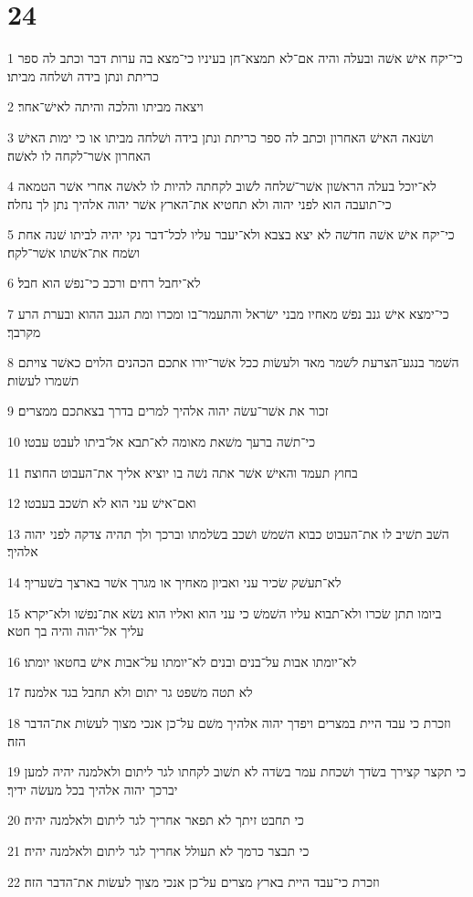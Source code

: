 \chapter{24}

\par 1 כי־יקח אישׁ אשׁה ובעלה והיה אם־לא תמצא־חן בעיניו כי־מצא בה ערות דבר וכתב לה ספר כריתת ונתן בידה ושׁלחה מביתו׃
\par 2 ויצאה מביתו והלכה והיתה לאישׁ־אחר׃
\par 3 ושׂנאה האישׁ האחרון וכתב לה ספר כריתת ונתן בידה ושׁלחה מביתו או כי ימות האישׁ האחרון אשׁר־לקחה לו לאשׁה׃
\par 4 לא־יוכל בעלה הראשׁון אשׁר־שׁלחה לשׁוב לקחתה להיות לו לאשׁה אחרי אשׁר הטמאה כי־תועבה הוא לפני יהוה ולא תחטיא את־הארץ אשׁר יהוה אלהיך נתן לך נחלה׃
\par 5 כי־יקח אישׁ אשׁה חדשׁה לא יצא בצבא ולא־יעבר עליו לכל־דבר נקי יהיה לביתו שׁנה אחת ושׂמח את־אשׁתו אשׁר־לקח׃
\par 6 לא־יחבל רחים ורכב כי־נפשׁ הוא חבל׃
\par 7 כי־ימצא אישׁ גנב נפשׁ מאחיו מבני ישׂראל והתעמר־בו ומכרו ומת הגנב ההוא ובערת הרע מקרבך׃
\par 8 השׁמר בנגע־הצרעת לשׁמר מאד ולעשׂות ככל אשׁר־יורו אתכם הכהנים הלוים כאשׁר צויתם תשׁמרו לעשׂות׃
\par 9 זכור את אשׁר־עשׂה יהוה אלהיך למרים בדרך בצאתכם ממצרים׃
\par 10 כי־תשׁה ברעך משׁאת מאומה לא־תבא אל־ביתו לעבט עבטו׃
\par 11 בחוץ תעמד והאישׁ אשׁר אתה נשׁה בו יוציא אליך את־העבוט החוצה׃
\par 12 ואם־אישׁ עני הוא לא תשׁכב בעבטו׃
\par 13 השׁב תשׁיב לו את־העבוט כבוא השׁמשׁ ושׁכב בשׂלמתו וברכך ולך תהיה צדקה לפני יהוה אלהיך׃
\par 14 לא־תעשׁק שׂכיר עני ואביון מאחיך או מגרך אשׁר בארצך בשׁעריך׃
\par 15 ביומו תתן שׂכרו ולא־תבוא עליו השׁמשׁ כי עני הוא ואליו הוא נשׂא את־נפשׁו ולא־יקרא עליך אל־יהוה והיה בך חטא׃
\par 16 לא־יומתו אבות על־בנים ובנים לא־יומתו על־אבות אישׁ בחטאו יומתו׃
\par 17 לא תטה משׁפט גר יתום ולא תחבל בגד אלמנה׃
\par 18 וזכרת כי עבד היית במצרים ויפדך יהוה אלהיך משׁם על־כן אנכי מצוך לעשׂות את־הדבר הזה׃
\par 19 כי תקצר קצירך בשׂדך ושׁכחת עמר בשׂדה לא תשׁוב לקחתו לגר ליתום ולאלמנה יהיה למען יברכך יהוה אלהיך בכל מעשׂה ידיך׃
\par 20 כי תחבט זיתך לא תפאר אחריך לגר ליתום ולאלמנה יהיה׃
\par 21 כי תבצר כרמך לא תעולל אחריך לגר ליתום ולאלמנה יהיה׃
\par 22 וזכרת כי־עבד היית בארץ מצרים על־כן אנכי מצוך לעשׂות את־הדבר הזה׃

